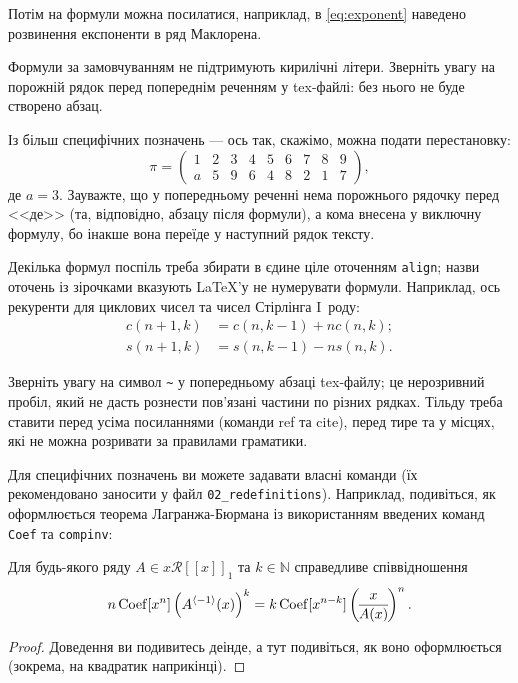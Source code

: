 Потім на формули можна посилатися, наприклад, в \eqref{eq:exponent} наведено розвинення експоненти в ряд Маклорена.

Формули за замовчуванням не підтримують кирилічні літери. Зверніть увагу на 
порожній рядок перед попереднім реченням у tex-файлі: без нього не буде 
створено абзац.

Із більш специфічних позначень --- ось так, скажімо, можна подати 
перестановку:
$$\pi = \begin{pmatrix}
	1 & 2 & 3 & 4 & 5 & 6 & 7 & 8 & 9\\
	a & 5 & 9 & 6 & 4 & 8 & 2 & 1 & 7
\end{pmatrix},$$
де $a=3$. Зауважте, що у попередньому реченні нема порожнього рядочку 
перед <<де>> (та, відповідно, абзацу після формули), а кома внесена у 
виключну формулу, бо інакше вона переїде у наступний рядок тексту.

Декілька формул поспіль треба збирати в єдине ціле оточенням \texttt{align}; назви оточень із зірочками вказують \LaTeX'у не нумерувати формули. Наприклад, ось рекуренти для циклових чисел та чисел Стірлінга 
I~роду:
\begin{align*}
	c(n+1, k) &= c(n, k-1)+nc(n, k); \\
	s(n+1, k) &= s(n, k-1)-ns(n, k).
\end{align*}

Зверніть увагу на символ \verb|~| у попередньому абзаці tex-файлу; це нерозривний пробіл, який не дасть рознести пов'язані 
частини по різних рядках. Тільду треба ставити перед усіма посиланнями 
(команди ref та cite), перед тире та у місцях, які не можна розривати за 
правилами граматики.

Для специфічних позначень ви можете задавати власні команди (їх 
рекомендовано заносити у файл \texttt{02\_redefinitions}). Наприклад, 
подивіться, як оформлюється теорема Лагранжа-Бюрмана із використанням 
введених команд \texttt{Coef} та \texttt{compinv}:

\begin{theorem} \label{thLagrangeBurmann}
	Для будь-якого ряду $A \in x \mathcal R[[x]]_1$ та $k \in \mathbb N$ справедливе співвідношення
	$$n \operatorname{Coef}[x^n] \left( A^{\left\langle -1 \right\rangle}(x) \right)^k = k \operatorname{Coef}[x^{n-k}] \left(\! \frac{x}{A(x)} \!\right)^n.$$
\end{theorem}
\begin{proof}
	Доведення ви подивитесь деінде, а тут подивіться, як воно оформлюється 
	(зокрема, на квадратик наприкінці). 
\end{proof}

